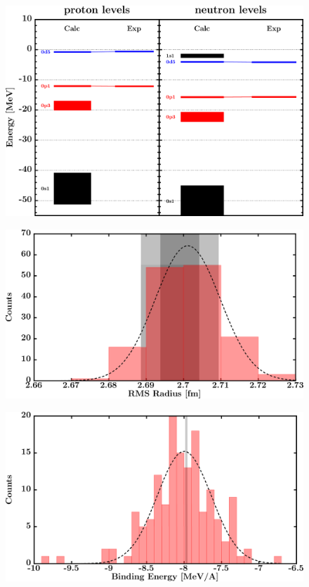 \documentclass[twocolumn,secnumarabic,amssymb, nobibnotes, aps, prl,
superscriptaddress, nobalancelastpage, draft]{revtex4}
\begin{document}
\begin{figure}[!htb]
\begin{minipage}{0.4\linewidth}
        \label{DOM_o16_chargeDensity}
    \end{minipage}
    \begin{minipage}{0.35\linewidth}
        \centering
        \includegraphics[width=\linewidth]{figures/o16_SPLevels.png}
        \label{DOM_o16_SPLevels}
    \end{minipage}
    \begin{minipage}{0.4\linewidth}
        \centering
        \includegraphics[width=\linewidth]{figures/o16_RMSRadius.png}
        \label{DOM_o16_RMSRadius}
    \end{minipage}
    \begin{minipage}{0.4\linewidth}
        \centering
        \includegraphics[width=\linewidth]{figures/o16_BE.png}

\end{minipage}
\end{figure}
\end{document}
